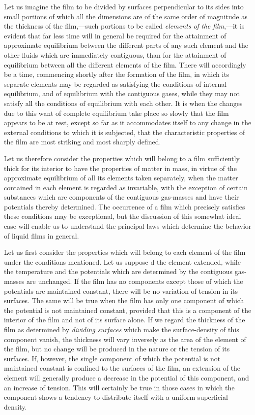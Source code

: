 \documentclass[12pt]{article}
\begin{document}
Let us imagine the film to be divided by surfaces perpendicular to its sides into small portions of which all the dimensions are of the same order of magnitude as the thickness of the film,---such portions to be called \textit{elements of the film},---it is evident that far less time will in general be required for the attainment of approximate equilibrium between the different parts of any such element and the other fluids which are immediately contiguous, than for the attainment of equilibrium between all the different elements of the film. There will accordingly be a time, commencing shortly after the formation of the film, in which its separate elements may be regarded as satisfying the conditions of internal equilibrium, and of equilibrium with the contiguous gases, while they may not satisfy all the conditions of equilibrium with each other. It is when the changes due to this want of complete equilibrium take place so slowly that the film appears to be at rest, except so far as it accommodates itself to any change in the external conditions to which it is subjected, that the characteristic properties of the film are most striking and most sharply defined.

Let us therefore consider the properties which will belong to a film sufficiently thick for its interior to have the properties of matter in mass, in virtue of the approximate equilibrium of all its elements taken separately, when the matter contained in each element is regarded as invariable, with the exception of certain substances which are components of the contiguous gas-masses and have their potentials thereby determined. The occurrence of a film which precisely satisfies these conditions may be exceptional, but the discussion of this somewhat ideal case will enable us to understand the principal laws which determine the behavior of liquid films in general.

Let us first consider the properties which will belong to each element of the film under the conditions mentioned. Let us suppose d the element extended, while the temperature and the potentials which are determined by the contiguous gas-masses are unchanged. If the film has no components except those of which the potentials are maintained constant, there will be no variation of tension in its surfaces. The same will be true when the film has only one component of which the potential is not maintained constant, provided that this is a component of the interior of the film and not of its surface alone. If we regard the thickness of the film as determined by \textit{dividing surfaces} which make the surface-density of this component vanish, the thickness will vary inversely as the area of the element of the film, but no change will be produced in the nature or the tension of its surfaces. If, however, the single component of which the potential is not maintained constant is confined to the surfaces of the film, an extension of the element will generally produce a decrease in the potential of this component, and an increase of tension. This will certainly be true in those cases in which the component shows a tendency to distribute itself with a uniform superficial density.
\end{document}
